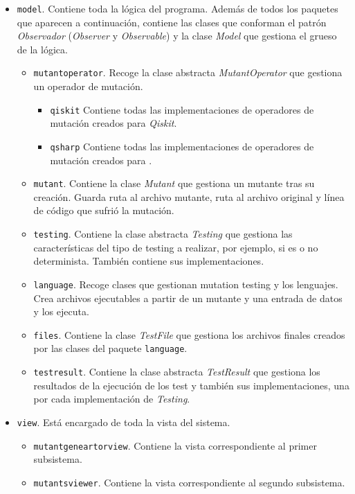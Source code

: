 \begin{itemize}
\item \texttt{model}. Contiene toda la lógica del programa. Además de todos los paquetes que aparecen a continuación, contiene las clases que conforman el patrón \textit{Observador} (\textit{Observer} y \textit{Observable}) y la clase \textit{Model} que gestiona el grueso de la lógica.
	\begin{itemize}
	\item \texttt{mutantoperator}. Recoge la clase abstracta \textit{MutantOperator} que gestiona un operador de mutación.
		\begin{itemize}
		\item \texttt{qiskit} Contiene todas las implementaciones de operadores de mutación creados para \textit{Qiskit}.
		\item \texttt{qsharp} Contiene todas las implementaciones de operadores de mutación creados para \qsh.
		\end{itemize}		 
	\item \texttt{mutant}. Contiene la clase \textit{Mutant} que gestiona un mutante tras su creación. Guarda ruta al archivo mutante, ruta al archivo original y línea de código que sufrió la mutación.
	\item \texttt{testing}. Contiene la clase abstracta \textit{Testing} que gestiona las características del tipo de testing a realizar, por ejemplo, si es o no determinista. También contiene sus implementaciones.
	\item \texttt{language}. Recoge clases que gestionan mutation testing y los lenguajes. Crea archivos ejecutables a partir de un mutante y una entrada de datos y los ejecuta.
	\item \texttt{files}. Contiene la clase \textit{TestFile} que gestiona los archivos finales creados por las clases del paquete \texttt{language}.
	\item \texttt{testresult}. Contiene la clase abstracta \textit{TestResult} que gestiona los resultados de la ejecución de los test y también sus implementaciones, una por cada implementación de \textit{Testing}.
	\end{itemize}
\item \texttt{view}. Está encargado de toda la vista del sistema.
	\begin{itemize}
	\item \texttt{mutantgeneartorview}. Contiene la vista correspondiente al primer subsistema.
	\item \texttt{mutantsviewer}. Contiene la vista correspondiente al segundo subsistema.

\end{itemize}
\end{itemize}

